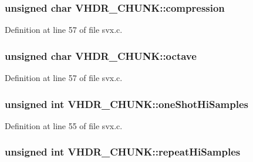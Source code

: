 \subsubsection[{\texorpdfstring{compression}{compression}}]{\setlength{\rightskip}{0pt plus 5cm}unsigned char V\+H\+D\+R\+\_\+\+C\+H\+U\+N\+K\+::compression}\hypertarget{struct_v_h_d_r___c_h_u_n_k_a0cd23287b962d8cdc586df4a46d37f60}{}\label{struct_v_h_d_r___c_h_u_n_k_a0cd23287b962d8cdc586df4a46d37f60}


Definition at line 57 of file svx.\+c.

\subsubsection[{\texorpdfstring{octave}{octave}}]{\setlength{\rightskip}{0pt plus 5cm}unsigned char V\+H\+D\+R\+\_\+\+C\+H\+U\+N\+K\+::octave}\hypertarget{struct_v_h_d_r___c_h_u_n_k_a26d86b8a0d41ee0a27d15dd4348cfa1b}{}\label{struct_v_h_d_r___c_h_u_n_k_a26d86b8a0d41ee0a27d15dd4348cfa1b}


Definition at line 57 of file svx.\+c.

\subsubsection[{\texorpdfstring{one\+Shot\+Hi\+Samples}{oneShotHiSamples}}]{\setlength{\rightskip}{0pt plus 5cm}unsigned {\bf int} V\+H\+D\+R\+\_\+\+C\+H\+U\+N\+K\+::one\+Shot\+Hi\+Samples}\hypertarget{struct_v_h_d_r___c_h_u_n_k_ad8306e8a8c66099b11418c86ed6fb97f}{}\label{struct_v_h_d_r___c_h_u_n_k_ad8306e8a8c66099b11418c86ed6fb97f}


Definition at line 55 of file svx.\+c.

\subsubsection[{\texorpdfstring{repeat\+Hi\+Samples}{repeatHiSamples}}]{\setlength{\rightskip}{0pt plus 5cm}unsigned {\bf int} V\+H\+D\+R\+\_\+\+C\+H\+U\+N\+K\+::repeat\+Hi\+Samples}\hypertarget{struct_v_h_d_r___c_h_u_n_k_a95a51d319c5be4b7cb88021473620539}{}\label{struct_v_h_d_r___c_h_u_n_k_a95a51d319c5be4b7cb88021473620539}



